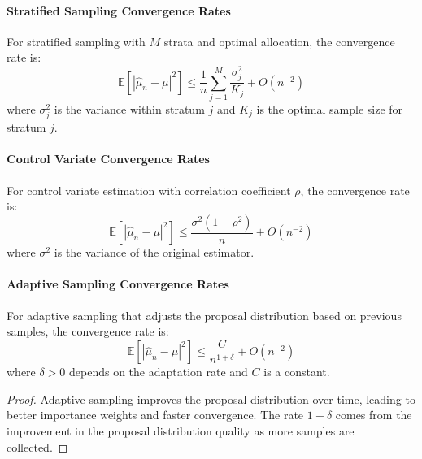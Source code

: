 \paragraph{Stratified Sampling Convergence Rates}

\begin{theorem}
For stratified sampling with $M$ strata and optimal allocation, the convergence rate is:
\begin{equation}
\mathbb{E}[|\hat{\mu}_n - \mu|^2] \leq \frac{1}{n} \sum_{j=1}^{M} \frac{\sigma_j^2}{K_j} + O(n^{-2})
\end{equation}
where $\sigma_j^2$ is the variance within stratum $j$ and $K_j$ is the optimal sample size for stratum $j$.
\end{theorem}

\paragraph{Control Variate Convergence Rates}

\begin{theorem}
For control variate estimation with correlation coefficient $\rho$, the convergence rate is:
\begin{equation}
\mathbb{E}[|\hat{\mu}_n - \mu|^2] \leq \frac{\sigma^2(1-\rho^2)}{n} + O(n^{-2})
\end{equation}
where $\sigma^2$ is the variance of the original estimator.
\end{theorem}

\paragraph{Adaptive Sampling Convergence Rates}

\begin{theorem}
For adaptive sampling that adjusts the proposal distribution based on previous samples, the convergence rate is:
\begin{equation}
\mathbb{E}[|\hat{\mu}_n - \mu|^2] \leq \frac{C}{n^{1+\delta}} + O(n^{-2})
\end{equation}
where $\delta > 0$ depends on the adaptation rate and $C$ is a constant.
\end{theorem}

\begin{proof}
Adaptive sampling improves the proposal distribution over time, leading to better importance weights and faster convergence. The rate $1+\delta$ comes from the improvement in the proposal distribution quality as more samples are collected.
\end{proof}

